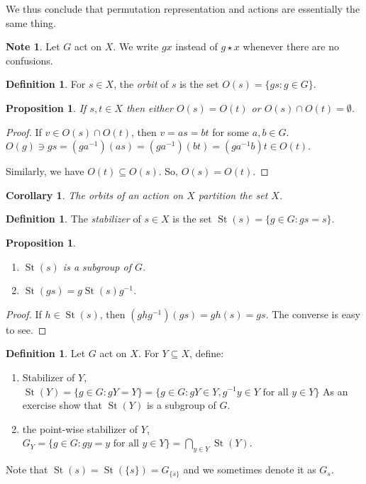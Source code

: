 \documentclass{amsart}
\newtheorem{prop}[thm]{Proposition}
\newtheorem{cor}[thm]{Corollary}
\theoremstyle{definition}
\newtheorem{definition}[thm]{Definition}
\newtheorem{note}[thm]{Note}
\DeclareMathOperator{\St}{St}
\begin{document}
We thus conclude that permutation representation and actions are essentially the same thing.
\begin{note}
	Let $G$ act on $X$. We write $gx$ instead of $g\star x$ whenever there are no confusions.
\end{note}
\begin{definition}
	For $s\in X$, the \emph{orbit} of $s$ is the set $O(s)=\{gs:g\in G\}$.
\end{definition}
\begin{prop}
	If $s,t\in X$ then either $O(s)=O(t)$ or $O(s)\cap O(t)=\emptyset$. 
\end{prop}
\begin{proof}
	If $v\in O(s)\cap O(t)$, then $v=as=bt$ for some $a,b\in G$. $O(g)\ni gs=(ga^{-1})(as)=(ga^{-1})(bt)=(ga^{-1}b)t\in O(t)$.
	
	Similarly, we have $O(t)\subseteq O(s)$. So, $O(s)=O(t)$.
\end{proof}
\begin{cor}
The orbits of an action on $X$ partition the set $X$.	
\end{cor}
\begin{definition}
	The \emph{stabilizer} of  $s\in X$ is the set $\St(s)=\{g\in G:gs=s\}$.
\end{definition}
\begin{prop}
	\begin{enumerate}
		\item $\St(s)$ is a subgroup of $G$.
		\item $\St(gs)=g\St(s)g^{-1}$.
	\end{enumerate}
\end{prop}
\begin{proof}
	If $h\in\St(s)$, then $(ghg^{-1})(gs)=gh(s)=gs$. The converse is easy to see.
\end{proof}
\begin{definition}
	Let $G$ act on $X$. For $Y\subseteq X$, define:
	\begin{enumerate}
		\item Stabilizer of $Y$, $\St(Y)=\{g\in G:gY=Y\}=\{g\in G:gY\in Y,g^{-1}y\in Y\text{ for all }y\in Y\}$
		As an exercise show that $\St(Y)$ is a subgroup of $G$.
		\item the point-wise stabilizer of $Y$, $G_Y=\{g\in G:gy=y\text{ for all }y\in Y\}=\bigcap\limits_{y\in Y}\St(Y)$.
	\end{enumerate}
\end{definition}
Note that $\St(s)=\St(\{s\})=G_{\{s\}}$ and we sometimes denote it as $G_s$.
\end{document}
